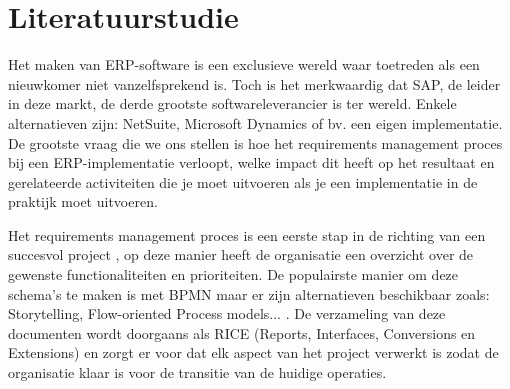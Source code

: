 
\chapter{Literatuurstudie}
\label{ch:literatuurstudie}

Het maken van ERP-software is een exclusieve wereld waar toetreden als een nieuwkomer niet vanzelfsprekend is. Toch is het merkwaardig dat SAP, de leider in deze markt, de derde grootste softwareleverancier is ter wereld. Enkele alternatieven zijn: NetSuite, Microsoft Dynamics of bv. een eigen implementatie.
De grootste vraag die we ons stellen is hoe het requirements management proces bij een ERP-implementatie verloopt, welke impact dit heeft op het resultaat en gerelateerde activiteiten die je moet uitvoeren als je een implementatie in de praktijk moet uitvoeren. 

Het requirements management proces is een eerste stap in de richting van een succesvol project \autocite{Williamson2018}, op deze manier heeft de organisatie een overzicht over de gewenste functionaliteiten en prioriteiten. De populairste manier om deze schema's te maken is met BPMN maar er zijn alternatieven beschikbaar zoals: Storytelling, Flow-oriented Process models... \autocite{Lillehagen2009}. De verzameling van deze documenten wordt doorgaans als RICE (Reports, Interfaces, Conversions en Extensions) \autocite{Williamson2018} en zorgt er voor dat elk aspect van het project verwerkt is zodat de organisatie klaar is voor de transitie van de huidige operaties. 

